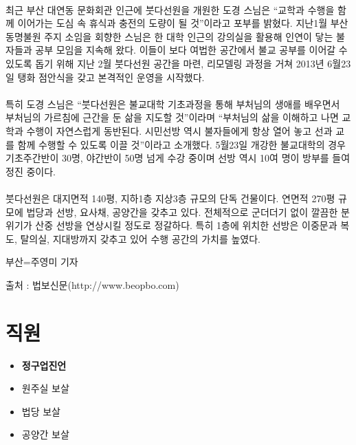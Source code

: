 \documentclass[12pt, a4paper, oneside]{book}
\let\stdsection\section
\renewcommand\section{\newpage\stdsection}
\begin{document}
\paragraph{}
최근 부산 대연동 문화회관 인근에 붓다선원을 개원한 도경 스님은 “교학과 수행을 함께 이어가는 도심 속 휴식과 충전의 도량이 될 것”이라고 포부를 밝혔다. 지난1월 부산 동명불원 주지 소임을 회향한 스님은 한 대학 인근의 강의실을 활용해 인연이 닿는 불자들과 공부 모임을 지속해 왔다. 이들이 보다 여법한 공간에서 불교 공부를 이어갈 수 있도록 돕기 위해 지난 2월 붓다선원 공간을 마련, 리모델링 과정을 거쳐 2013년 6월23일 탱화 점안식을 갖고 본격적인 운영을 시작했다.


\paragraph{}
특히 도경 스님은 “붓다선원은 불교대학 기초과정을 통해 부처님의 생애를 배우면서 부처님의 가르침에 근간을 둔 삶을 지도할 것”이라며 “부처님의 삶을 이해하고 나면 교학과 수행이 자연스럽게 동반된다. 시민선방 역시 불자들에게 항상 열어 놓고 선과 교를 함께 수행할 수 있도록 이끌 것”이라고 소개했다. 5월23일 개강한 불교대학의 경우 기초주간반이 30명, 야간반이 50명 넘게 수강 중이며 선방 역시 10여 명이 방부를 들여 정진 중이다.


\paragraph{}
붓다선원은 대지면적 140평, 지하1층 지상3층 규모의 단독 건물이다. 연면적 270평 규모에 법당과 선방, 요사채, 공양간을 갖추고 있다. 전체적으로 군더더기 없이 깔끔한 분위기가 산중 선방을 연상시킬 정도로 정갈하다. 특히 1층에 위치한 선방은 이중문과 복도, 탈의실, 지대방까지 갖추고 있어 수행 공간의 가치를 높였다.


부산=주영미 기자

출처 : 법보신문(http://www.beopbo.com)





%
	\section{직원}


\begin{itemize}[					
		topsep=0.0em,			
		parsep=0.0em,			
		itemsep=0em,			
		leftmargin=		2	em,
		labelwidth=1em,			
		labelsep=1em			
]					
	\item		\textbf{정구업진언} 
	\item	원주실 보살
	\item	법당 보살
	\item	공양간 보살
\end{itemize}					
\end{document}
